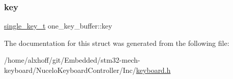 \subsubsection{\texorpdfstring{key}{key}}
{\footnotesize\ttfamily \hyperlink{keyboard_8h_aa504c5d09bf7cea600b72b6003a8772c}{single\+\_\+key\+\_\+t} one\+\_\+key\+\_\+buffer\+::key}



The documentation for this struct was generated from the following file\+:\begin{DoxyCompactItemize}
\item 
/home/alxhoff/git/\+Embedded/stm32-\/mech-\/keyboard/\+Nucelo\+Keyboard\+Controller/\+Inc/\hyperlink{keyboard_8h}{keyboard.\+h}\end{DoxyCompactItemize}
